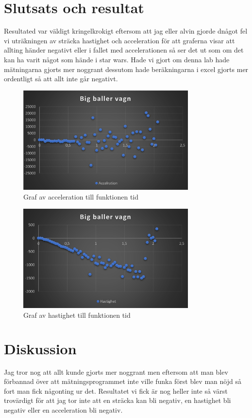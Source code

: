 \documentclass[11p, titlepage, oneside, a4paper]{article}
\begin{document}
    \section{Slutsats och resultat} 
        Resultated var väldigt kringelkrokigt eftersom att jag eller alvin gjorde dnågot fel vi uträkningen av sträcka hastighet och acceleration för att graferna visar att allting händer negativt eller i fallet med accelerationen så ser det ut som om det kan ha varit något som hände i star wars. Hade vi gjort om denna lab hade mätningarna gjorts mer noggrant dessutom hade beräkningarna i excel gjorts mer ordentligt så att allt inte går negativt.
\begin{figure}[!h]
	\includegraphics[width=0.8\textwidth]{images/Bild2.png}
	\caption{Graf av acceleration till funktionen tid}
	\label{fig:Bild2}
\end{figure}
\begin{figure}[!h]
	\includegraphics[width=0.8\textwidth]{images/Bild1.png}
	\caption{Graf av hastighet till funktionen tid}
	\label{fig:Bild1}
\end{figure}
    \section{Diskussion} 
    Jag tror nog att allt kunde gjorts mer noggrant men eftersom att man blev förbannad över att mätningsprogrammet inte ville funka först blev man nöjd så fort man fick någonting ur det. Resultatet vi fick är nog heller inte så värst trovärdigt för att jag tor inte att en sträcka kan bli negativ, en hastighet bli negativ eller en acceleration bli negativ.

    
    \printbibliography
\end{document}
